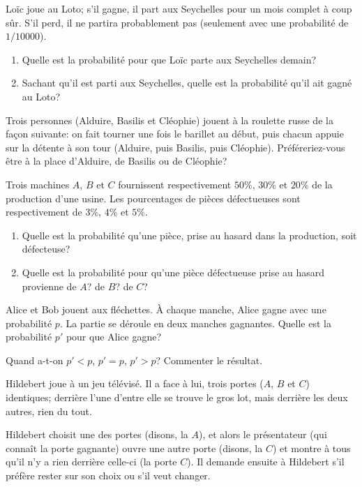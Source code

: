 \documentclass{yann}
\begin{document}
\Exercice

Loïc joue au Loto; s'il gagne, il part aux Seychelles pour un mois complet à
coup sûr. S'il perd, il ne partira probablement pas (seulement avec une
probabilité de $1/10000$).
\begin{enumerate}
\item
  Quelle est la probabilité pour que Loïc parte aux Seychelles demain?
\item
  Sachant qu'il est parti aux Seychelles, quelle est la probabilité qu'il ait gagné au Loto?
\end{enumerate}

\Exercice

Trois personnes (Alduire, Basilis et Cléophie)
jouent à la roulette russe
de la façon suivante: on fait tourner une fois le barillet au début,
puis chacun appuie sur la détente à son tour
(Alduire, puis Basilis, puis Cléophie).
Préféreriez-vous être à la place d'Alduire, de Basilis ou de Cléophie?

\Exercice

Trois machines $A$, $B$ et $C$ fournissent respectivement $50\%$, $30\%$
et $20\%$ de la production d'une usine. Les pourcentages de pièces
défectueuses sont respectivement de $3\%$, $4\%$ et $5\%$.
\begin{enumerate}
\item
  Quelle est la probabilité qu'une pièce, prise au hasard dans la production, soit défecteuse?
\item
  Quelle est la probabilité pour qu'une pièce défectueuse prise au hasard
  provienne de $A$? de $B$? de $C$?
\end{enumerate}

\Exercice

Alice et Bob jouent aux fléchettes.
À chaque manche, Alice gagne avec une probabilité $p$.
La partie se déroule en deux manches gagnantes.
Quelle est la probabilité $p'$ pour que Alice gagne?

Quand a-t-on $p' < p$, $p' = p$, $p' > p$? Commenter le résultat.


Hildebert joue à un jeu télévisé.
Il a face à lui, trois portes ($A$, $B$ et $C$) identiques;
derrière l'une d'entre elle se trouve le gros lot, mais derrière
les deux autres, rien du tout.

Hildebert choisit une des portes (disons, la $A$), et alors le
présentateur (qui connaît la porte gagnante) ouvre une autre porte
(disons, la $C$) et montre à tous qu'il n'y a rien derrière
celle-ci (la porte $C$).
Il demande ensuite à Hildebert s'il préfère rester sur son choix
ou s'il veut changer.
\end{document}
